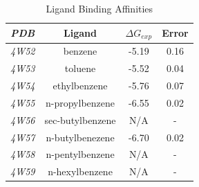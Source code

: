 \documentclass[journal=jctcce,manuscript=article]{achemso}
\begin{document}
\begin{table}[!htb]
\centering
\caption{Ligand Binding Affinities}
\label{tbl:lig-aff}
\begin{tabular}{|c|c|c|c|}
\hline
\textit{\textbf{PDB}} & \textbf{Ligand}                          & \boldmath$\Delta G_{exp}$                                            & \textbf{Error} \\ \hline
\textit{4W52}         & \cellcolor[HTML]{800080}benzene          & -5.19                                                                & 0.16           \\ \hline
\textit{4W53}         & \cellcolor[HTML]{800080}toluene          & -5.52                                                                & 0.04           \\ \hline
\textit{4W54}         & \cellcolor[HTML]{800080}ethylbenzene     & -5.76                                                                & 0.07           \\ \hline
\textit{4W55}         & \cellcolor[HTML]{800080}n-propylbenzene  & -6.55                                                                & 0.02           \\ \hline
\textit{4W56}         & \cellcolor[HTML]{00FFFF}sec-butylbenzene & N/A                                                                  & -              \\ \hline
\textit{4W57}         & \cellcolor[HTML]{00FFFF}n-butylbenezene  & -6.70                                                                & 0.02           \\ \hline
\textit{4W58}         & \cellcolor[HTML]{008000}n-pentylbenzene  & N/A                                                                  & -              \\ \hline
\textit{4W59}         & \cellcolor[HTML]{008000}n-hexylbenzene   & N/A                                                                  & -              \\ \hline
\end{tabular}
\end{table}
\end{document}

